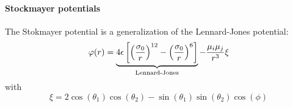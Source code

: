 \paragraph{Stockmayer potentials}

The Stokmayer potential is a generalization of the Lennard-Jones potential:
\begin{equation}
\varphi(r) = \underbrace{4 \LJdepth \left[\left(\frac{\LJdia[0]}{r}\right)^{12} - \left(\frac{\LJdia[0]}{r}\right)^{6}\right]}_\text{Lennard-Jones}
             - \frac{\dipole[i]\dipole[j]}{r^3}\xi
\label{Stockmayer:equation}
\end{equation}
with 
\begin{equation}
\xi = 2 \cos(\theta_1)\cos(\theta_2) - \sin(\theta_1)\sin(\theta_2)\cos(\phi)
\end{equation}
